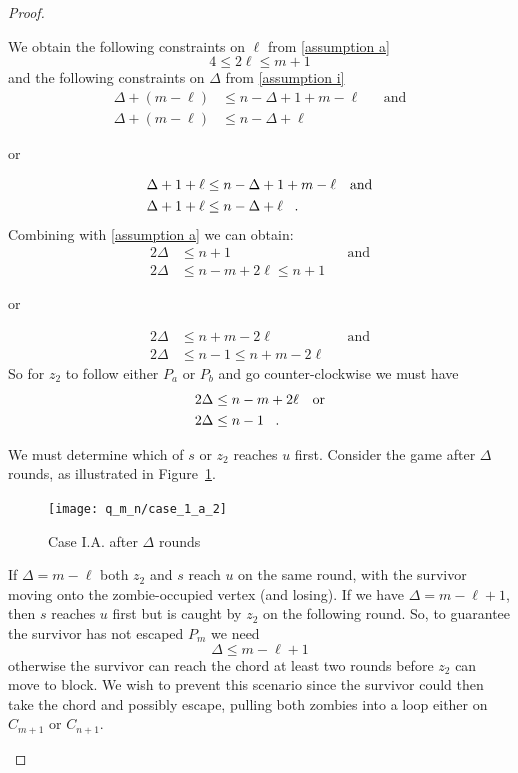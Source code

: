 \begin{proof}
\begin{proofpart}
\begin{itemize}
  We obtain the following constraints on $\ell$ from \ref{assumption a}
  \[ 4 \leq 2 \ell \leq m + 1 \]
  and the following constraints on $\Delta$ from \ref{assumption i}
  \begin{align*}
   \Delta + (m - \ell) &\leq n - \Delta + 1 + m - \ell && \text{and} \\
   \Delta + (m - \ell) &\leq n - \Delta + \ell
  \end{align*}
  \begin{center}or\end{center}
  \begin{align*}
   \Delta + 1 + \ell &\leq n - \Delta + 1 + m - \ell && \text{and} \\
   \Delta + 1 + \ell &\leq n - \Delta + \ell \mperiod
  \end{align*}
  Combining with \ref{assumption a} we can obtain:
  \begin{align*}
   2 \Delta &\leq n+1 && \text{and} \\
   2 \Delta &\leq n - m + 2\ell \leq n+1
  \end{align*}
  \begin{center}or\end{center}
  \begin{align*}
   2 \Delta &\leq n+m -2 \ell && \text{and} \\
   2 \Delta &\leq n -1 \leq n + m - 2\ell
  \end{align*}
  So for $z_2$ to follow either $P_a$ or $P_b$ and go counter-clockwise we must have
  \begin{align*}
   2 \Delta &\leq n - m + 2\ell && \text{or} \\
   2 \Delta &\leq n - 1 \mperiod
  \end{align*}

  We must determine which of $s$ or $z_2$ reaches $u$ first. Consider the game after $\Delta$ rounds, as illustrated in Figure~\ref{fig:case_1_a_2}.

  \begin{figure}
    \centering
    \texttt{[image: q\_m\_n/case\_1\_a\_2]}
    \caption{Case I.A. after $\Delta$ rounds \label{fig:case_1_a_2}}
  \end{figure}

  If $\Delta = m - \ell$ both $z_2$ and $s$ reach $u$ on the same round,
  with the survivor moving onto the zombie-occupied vertex (and losing).
  If we have $\Delta = m - \ell + 1$, then $s$ reaches $u$ first
  but is caught by $z_2$ on the following round.
  So, to guarantee the survivor has not escaped $P_m$ we need
  \[ \Delta \leq m- \ell + 1 \]
  otherwise the survivor can reach the chord at least two rounds
  before $z_2$ can move to block. We wish to prevent this scenario since
  the survivor could then take the chord and possibly escape, pulling
  both zombies into a loop either on $C_{m+1}$ or $C_{n+1}$.


\end{itemize}
\end{proofpart}
\end{proof}
